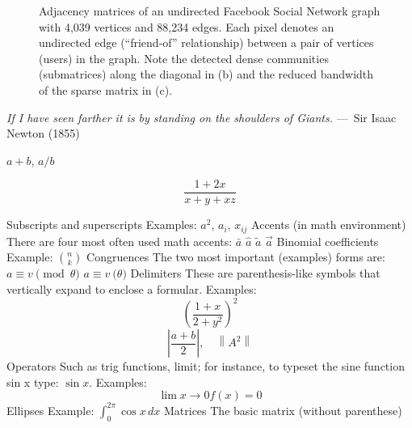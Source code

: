 \begin{figure}[!htp]
    \centering
    \hfil   
    \hfil
    \caption{Adjacency matrices of an undirected Facebook Social Network graph with 4,039 vertices and 88,234 edges. Each pixel denotes an undirected edge (``friend-of'' relationship) between a pair of vertices (users) in the graph. Note the detected dense communities (submatrices) along the diagonal in (b) and the reduced bandwidth of the sparse matrix in (c). }\label{fig:fb_adjmats}
\end{figure}

\begin{epigraph}
    \emph{If I have seen farther it is by standing on the shoulders of
    Giants.} ---~Sir Isaac Newton (1855)
\end{epigraph}

$ a + b $,   $ a/b $

\[
  \frac{1 + 2x}{x + y + xz}
\]

Subscripts and superscripts
Examples:   $a^2$,  $a_i$,   $x_{ij}$
Accents (in math environment)
There are four most often used math accents:
$\bar{a}$
$\hat{a}$
$\tilde{a}$
$\vec{a}$
Binomial coefficients
Example:  $ \binom{n}{k} $
Congruences
The two most important (examples) forms are:
$a \equiv v \pmod{\theta}$
$a \equiv v \pod{\theta}$
Delimiters
These are parenthesis-like symbols that vertically expand to enclose a formular.
Examples:
\[
  \left( \frac{1 + x}{2 + y^{2}} \right) ^{2}
\]
\[
  \left| \frac{a + b}{2} \right|,
    \quad \left\| A^{2} \right\|
\]
Operators
Such as trig functions, limit; for instance, to typeset the sine function sin x
type: $\sin x$.
Examples:
\[
  \lim{x \to 0} f(x) = 0
\]
Ellipses
Example: $\int_{0}^{2 \pi} \cos x \, dx$
Matrices
The basic matrix (without parenthese)

